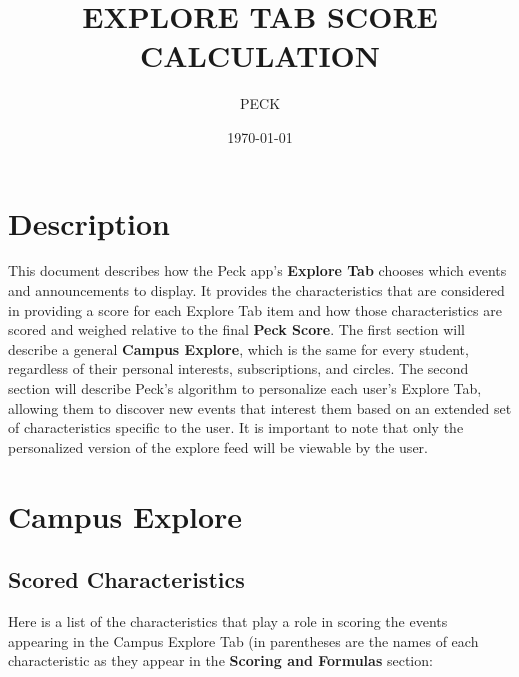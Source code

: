 \documentclass[12pt]{amsart}
\begin{document}
  

\title{EXPLORE TAB SCORE CALCULATION}

\author{PECK}

\date{\today}

\maketitle  %


\section*{Description}

This document describes how the Peck app's \textbf{Explore Tab} chooses which events and announcements to display. It provides the characteristics that are considered in providing a score for each Explore Tab item and how those characteristics are scored and weighed relative to the final \textbf{Peck Score}. The first section will describe a general \textbf{Campus Explore}, which is the same for every student, regardless of their personal interests, subscriptions, and circles. The second section will describe Peck's algorithm to personalize each user's Explore Tab, allowing them to discover new events that interest them based on an extended set of characteristics specific to the user. It is important to note that only the personalized version of the explore feed will be viewable by the user. 

\section*{Campus Explore}

\subsection*{Scored Characteristics}

Here is a list of the characteristics that play a role in scoring the events appearing in the Campus Explore Tab (in parentheses are the names of each characteristic as they appear in the \textbf{Scoring and Formulas} section: \newline
\end{document}
